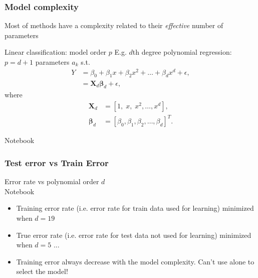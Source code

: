 \documentclass[pressentation,9pt,aspectratio=1610,xcolor=table]{beamer}
\newcommand{\doigt}{\noindent \Pisymbol{pzd}{43}}
\begin{document}
\begin{frame}
  \frametitle{Model complexity}
  Most of methods have a complexity related to their {\it effective} number of parameters

  \begin{block}{Linear classification: model order $p$}
  E.g. $d$th degree polynomial regression: $p=d+1$ parameters $a_k$ s.t.
    \begin{align*}
       Y &= \beta_0 + \beta_1 x + \beta_2 x^{2} + \ldots + \beta_d x^{d} + \epsilon,\\
       &= \boldsymbol{X}_d \boldsymbol{\beta}_d + \epsilon,
    \end{align*}
    where
    \begin{align*}
       \boldsymbol{X}_d &= \left[1, \;  x, \;  x^2, \ldots, x^d\right], \\
       \boldsymbol{\beta}_d &= \left[\beta_0, \beta_1, \beta_2, \ldots, \beta_d\right]^T.
    \end{align*}

  \end{block}
  \alert{Notebook}
\end{frame}

\begin{frame}
  \frametitle{Test error vs Train Error}

  \begin{minipage}{.45\textwidth}
    \begin{center}
      Error rate vs polynomial order $d$\\
      \alert{Notebook}
    \end{center}
  \end{minipage}
  \begin{minipage}{.54\textwidth}
    \begin{itemize}
    \item Training error rate (i.e. error rate for train data used for learning) minimized when $d=19$
    \item True error rate (i.e. error rate for test data not used for learning) minimized when $d=5$ ...
  \end{itemize}
\end{minipage}

\begin{itemize}
\item[\doigt] Training error always decrease with the model complexity. \alert{Can't use alone to select the model!}
\end{itemize}


\end{frame}
\end{document}
